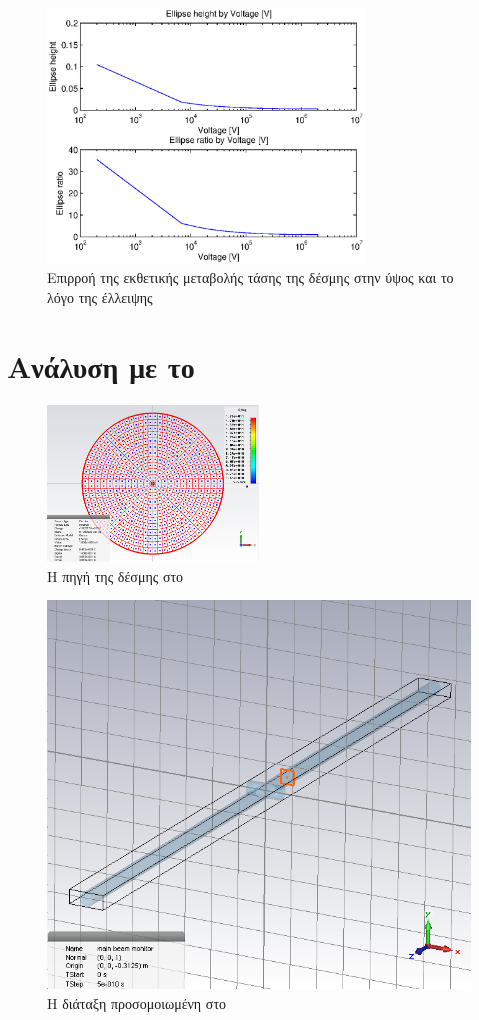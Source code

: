 \begin{figure}[tbh]
\includegraphics[width=0.75\textwidth]{figures/beam_deflection_script_07}
\centering
\caption{Επιρροή της εκθετικής μεταβολής τάσης της δέσμης στην ύψος και το λόγο της έλλειψης}
\label{fig:beam_deflection_script_07}
\end{figure}

\section{Ανάλυση με το }

\begin{figure}[tbh]
\includegraphics[width=0.5\textwidth]{figures/CST-main-beam-source}
\centering
\caption{Η πηγή της δέσμης στο }
\label{fig:CST-mainBeamSource}
\end{figure}

\begin{figure}[tbh]
\includegraphics[width=\textwidth]{figures/CST-pic-monitor}
\centering
\caption{Η διάταξη προσομοιωμένη στο }
\label{fig:CST-PICmonitor}
\end{figure}
